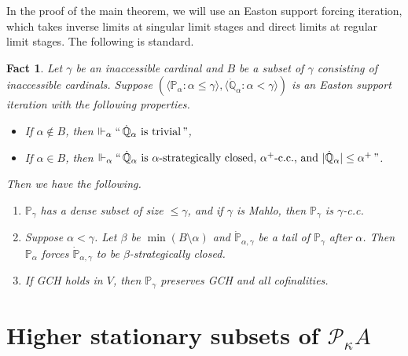 \documentclass[a4paper,12pt,reqno,oneside]{amsart}
\theoremstyle{plain}
\newtheorem{fact}[theorem]{Fact}
\newcommand{\mbb}{\mathbb}
\newcommand{\mcal}{\mathcal}
\begin{document}
In the proof of the main theorem, we will use an Easton support forcing iteration, which takes inverse limits at singular limit stages and direct limits at regular limit stages. The following is standard.


\begin{fact} \label{fact:Easton_it_basics}
Let $\gamma$ be an inaccessible cardinal and $B$ be a subset of $\gamma$ consisting of inaccessible cardinals. Suppose $( \langle \mbb{P}_\alpha : \alpha \leq \gamma \rangle , \langle \dot{\mbb{Q}}_\alpha : \alpha < \gamma \rangle )$ is an Easton support iteration with the following properties.
\begin{itemize}
\item[(i)] If $\alpha \notin B$, then $\Vdash_\alpha ``\,\mbox{$\dot{\mbb{Q}}_\alpha$ is trivial}\,"$,
\item[(ii)] If $\alpha \in B$, then $\Vdash_\alpha ``\,\mbox{$\dot{\mbb{Q}}_\alpha$ is $\alpha$-strategically closed, $\alpha^+$-c.c., and $| \dot{\mbb{Q}}_\alpha | \leq \alpha^+$}\,"$.
\end{itemize}
Then we have the following.
\begin{enumerate}
\item $\mbb{P}_\gamma$ has a dense subset of size $\leq \gamma$, and if $\gamma$ is Mahlo, then $\mbb{P}_\gamma$ is $\gamma$-c.c.
\item Suppose $\alpha < \gamma$. Let $\beta$ be $\min ( B \setminus \alpha )$ and $\dot{\mbb{P}}_{\alpha , \gamma}$ be a tail of $\mbb{P}_\gamma$ after $\alpha$. Then $\mbb{P}_\alpha$ forces $\dot{\mbb{P}}_{\alpha , \gamma}$ to be $\beta$-strategically closed.
\item If GCH holds in $V$, then $\mbb{P}_\gamma$ preserves GCH and all cofinalities.
\end{enumerate}
\end{fact}





\section{Higher stationary subsets of $\mcal{P}_\kappa A$} \label{sec:higher_stat}
\end{document}
